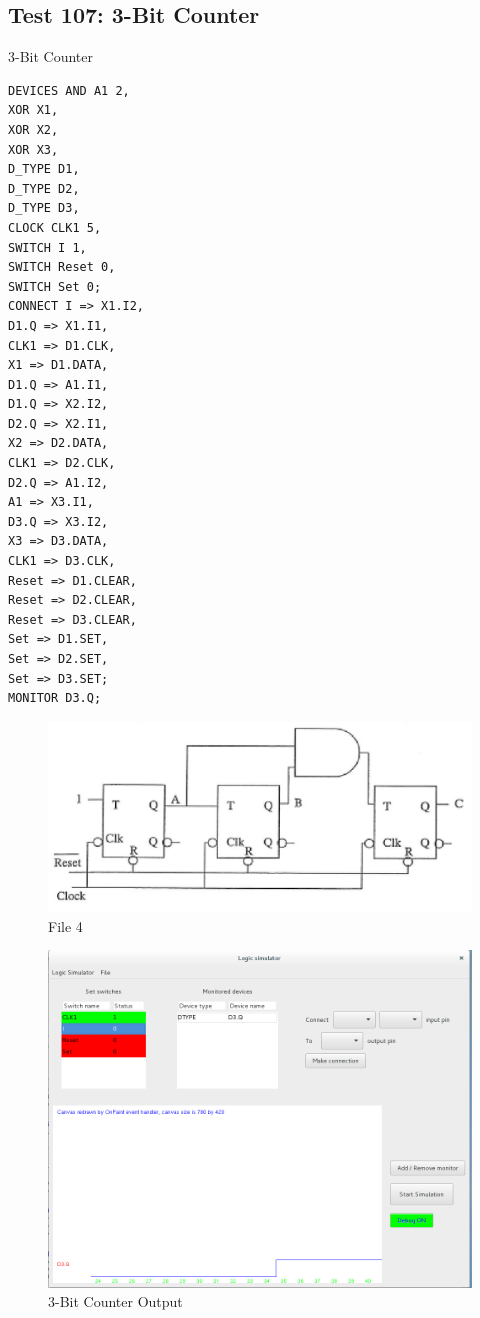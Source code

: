 \documentclass[12pt]{article}
\begin{document}
\subsection{Test 107: 3-Bit Counter}
3-Bit Counter\\
\begin{verbatim}
DEVICES	AND A1 2,
XOR X1,
XOR X2,
XOR X3,
D_TYPE D1,
D_TYPE D2,
D_TYPE D3,
CLOCK CLK1 5,
SWITCH I 1,
SWITCH Reset 0,
SWITCH Set 0;
CONNECT	I => X1.I2,
D1.Q => X1.I1,
CLK1 => D1.CLK,
X1 => D1.DATA,
D1.Q => A1.I1,
D1.Q => X2.I2,
D2.Q => X2.I1,
X2 => D2.DATA,
CLK1 => D2.CLK,
D2.Q => A1.I2,
A1 => X3.I1,
D3.Q => X3.I2,
X3 => D3.DATA,
CLK1 => D3.CLK,
Reset => D1.CLEAR,
Reset => D2.CLEAR,
Reset => D3.CLEAR,
Set => D1.SET,
Set => D2.SET,
Set => D3.SET;
MONITOR	D3.Q;
\end{verbatim}
\begin{figure}[H]
	\centering
	\includegraphics[width=0.9\linewidth]{figures/test107.png}
	\captionsetup{width=.7\linewidth}
	\caption{File 4}
	\label{fig:6}
\end{figure}

\begin{figure}[H]
	\centering
	\includegraphics[width=0.9\linewidth]{figures/test107_GUI.png}
	\captionsetup{width=.7\linewidth}
	\caption{3-Bit Counter Output}
	\label{fig:7}
\end{figure}
\end{document}
